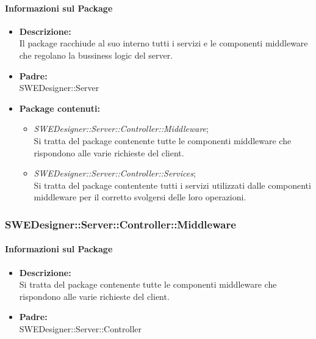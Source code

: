 		\paragraph{Informazioni sul Package}
		\begin{itemize}
			\item \textbf{Descrizione: }\\
			Il package racchiude al suo interno tutti i servizi e le componenti middleware che regolano la bussiness logic del server.
			\item \textbf{Padre: }\\ SWEDesigner::Server
			\item \textbf{Package contenuti: }
			\begin{itemize}
				\item \emph{SWEDesigner::Server::Controller::Middleware};\\
				Si tratta del package contenente tutte le componenti middleware che rispondono alle varie richieste del client.
				\item \emph{SWEDesigner::Server::Controller::Services};\\
				Si tratta del package contentente tutti i servizi utilizzati dalle componenti middleware per il corretto svolgersi delle loro operazioni.
			\end{itemize}
		\end{itemize}

		\subsubsection{SWEDesigner::Server::Controller::Middleware}
		\paragraph{Informazioni sul Package}
		\begin{itemize}
			\item \textbf{Descrizione: }\\
			Si tratta del package contenente tutte le componenti middleware che rispondono alle varie richieste del client.
			\item \textbf{Padre: }\\ SWEDesigner::Server::Controller
		\end{itemize}
